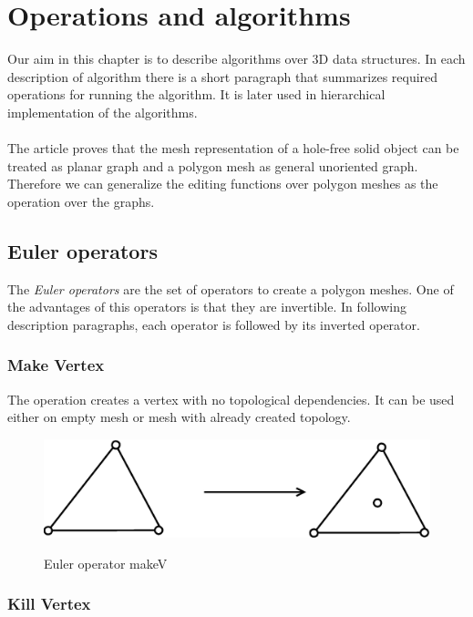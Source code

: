 \chapter{Operations and algorithms}

\label{chap:op_al}

Our aim in this chapter is to describe algorithms over 3D data structures. In each description of
algorithm there is a short paragraph that summarizes required operations for running the algorithm.
It is later used in hierarchical implementation of the algorithms.\\
\\
The article\cite{Grunbaum2007} proves that the mesh representation of a hole-free solid object can be
treated as planar graph and a polygon mesh as general unoriented graph. Therefore we can generalize the
editing functions over polygon meshes as the operation over the graphs.\\

\section{Euler operators}
\label{sec:euler}

The \emph{Euler operators} are the set of operators to create a polygon meshes. One of the advantages
of this operators is that they are invertible. In following description paragraphs,
each operator is followed by its inverted operator.

\subsection{Make Vertex}

The operation creates a vertex with no topological dependencies. It can be used
either on empty mesh or mesh with already created topology.

\begin{figure}[h]
\centering
\includegraphics[scale=0.25]{../img/makeV.eps}
\label{fig:makev}
\caption{Euler operator makeV}
\end{figure}

\subsection{Kill Vertex}

